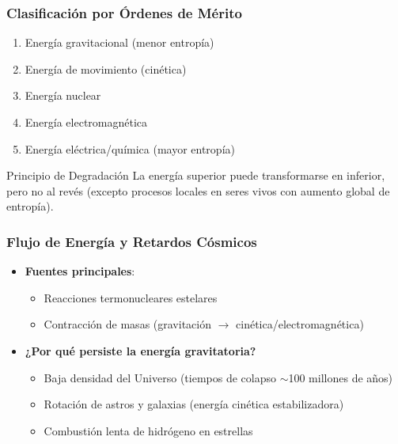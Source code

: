 \documentclass[main.tex]{subfiles}
\begin{document}
\begin{frame}
\frametitle{Clasificación por Órdenes de Mérito}
\begin{enumerate}
    \item Energía gravitacional (menor entropía)
    \item Energía de movimiento (cinética)
    \item Energía nuclear
    \item Energía electromagnética
    \item Energía eléctrica/química (mayor entropía)
\end{enumerate}
\vspace{5mm}
\begin{block}{Principio de Degradación}
La energía superior puede transformarse en inferior, pero no al revés (excepto procesos locales en seres vivos con aumento global de entropía).
\end{block}
\end{frame}

\begin{frame}
\frametitle{Flujo de Energía y Retardos Cósmicos}
\begin{itemize}
    \item \textbf{Fuentes principales}: 
    \begin{itemize}
        \item Reacciones termonucleares estelares
        \item Contracción de masas (gravitación $\rightarrow$ cinética/electromagnética)
    \end{itemize}
    
    \item \textbf{¿Por qué persiste la energía gravitatoria?} 
    \begin{itemize}
        \item Baja densidad del Universo (tiempos de colapso $\sim$100 millones de años)
        \item Rotación de astros y galaxias (energía cinética estabilizadora)
        \item Combustión lenta de hidrógeno en estrellas
    \end{itemize}
\end{itemize}
\end{frame}
\end{document}
